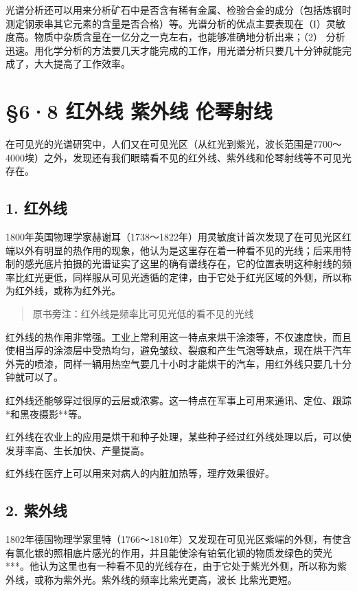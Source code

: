 光谱分析还可以用来分析矿石中是否含有稀有金属、检验合金的成分（包括炼钢时测定钢汞串其它元素的含量是否合格）等。光谱分析的优点主要表现在（I）灵敏度高。物质中杂质含量在一亿分之一克左右，也能够准确地分析出来；（2）
分析迅速。用化学分析的方法要几天才能完成的工作，用光谱分析只要几十分钟就能完成了，大大提高了工作效率。

\section{§6·8 红外线 紫外线
伦琴射线}

在可见光的光谱研究中，人们又在可见光区（从红光到紫光，波长范围是7700～4000埃）之外，发现还有我们眼睛看不见的红外线、紫外线和伦琴射线等不可见光存在。

\subsection{1. 红外线}

1800年英国物理学家赫谢耳（1738～1822年）用灵敏度计首次发现了在可见光区红端以外有明显的热作用的现象，他认为是这里存在着一种看不见的光线；后来用特制的感光底片拍摄的光谱证实了这里的确有谱线存在，它的位置表明这种射线的频率比红光更低，同样服从可见光透循的定律，由于它处于红光区域的外侧，所以称为红外线，或称为红外光。

\begin{quote}
原书旁注：红外线是频率比可见光低的看不见的光线
\end{quote}

红外线的热作用非常强。工业上常利用这一特点来烘干涂漆等，不仅速度快，而且使相当厚的涂漆层中受热均匀，避免皱纹、裂痕和产生气泡等缺点，现在烘干汽车外壳的喷漆，同样一辆用热空气要几十小时才能烘干的汽车，用红外线只要几十分钟就可以了。

红外线还能够穿过很厚的云层或浓雾。这一特点在军事上可用来通讯、定位、跟踪*和黑夜摄影**等。

红外线在农业上的应用是烘干和种子处理，某些种子经过红外线处理以后，可以使发芽率高、生长加快、产量提高。

红外线在医疗上可以用来对病人的内脏加热等，理疗效果很好。

\subsection{2. 紫外线}

1802年德国物理学家里特（1766～1810年）又发现在可见光区紫端的外侧，有使含有氯化银的照相底片感光的作用，并且能使涂有铂氧化钡的物质发绿色的荧光***。他认为这里也有一种看不见的光线存在，由于它处于紫光外侧，所以称为紫外线，或称为紫外光。紫外线的频率比紫光更高，波长
比紫光更短。

